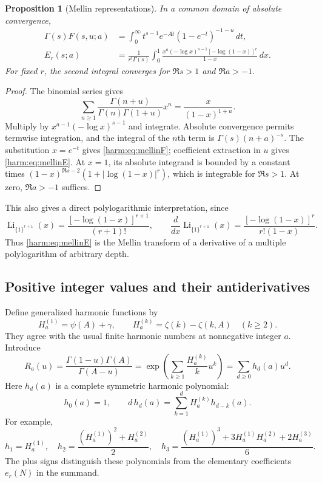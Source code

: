 \documentclass[11pt,letterpaper]{article}
\numberwithin{equation}{section}
\theoremstyle{plain}
\newtheorem{proposition}[theorem]{Proposition}
\theoremstyle{definition}
\theoremstyle{remark}
\begin{document}
\begin{proposition}[Mellin representations]\label{harm:prop:mellin}
In a common domain of absolute convergence,
\begin{align}
 \Gamma(s)F(s,u;a)
 &=\int_0^{\infty}t^{s-1}e^{-At}
                  (1-e^{-t})^{-1-u}\,dt,\label{harm:eq:mellinF}\\
 E_r(s;a)
 &=\frac1{r!\Gamma(s)}\int_0^1
       \frac{x^a(-\log x)^{s-1}[-\log(1-x)]^r}{1-x}\,dx.
       \label{harm:eq:mellinE}
\end{align}
For fixed $r$, the second integral converges for $\Re s>1$ and
$\Re a>-1$.
\end{proposition}
\begin{proof}
The binomial series gives
\[
 \sum_{n\geq1}\frac{\Gamma(n+u)}{\Gamma(n)\Gamma(1+u)}x^n
       =\frac{x}{(1-x)^{1+u}}.
\]
Multiply by $x^{a-1}(-\log x)^{s-1}$ and integrate.  Absolute
convergence permits termwise integration, and the integral of the
$n$th term is $\Gamma(s)(n+a)^{-s}$.  The substitution $x=e^{-t}$
gives \eqref{harm:eq:mellinF}; coefficient extraction in $u$ gives
\eqref{harm:eq:mellinE}.  At $x=1$, its absolute integrand is bounded
by a constant times
$(1-x)^{\Re s-2}(1+|\log(1-x)|^r)$, which is integrable for
$\Re s>1$.  At zero, $\Re a>-1$ suffices.
\end{proof}

This also gives a direct polylogarithmic interpretation, since
\[
 \operatorname{Li}_{\{1\}^{r+1}}(x)
 =\frac{[-\log(1-x)]^{r+1}}{(r+1)!},\qquad
 \frac{d}{dx}\operatorname{Li}_{\{1\}^{r+1}}(x)
 =\frac{[-\log(1-x)]^r}{r!(1-x)}.
\]
Thus \eqref{harm:eq:mellinE} is the Mellin transform of a derivative
of a multiple polylogarithm of arbitrary depth.

\subsection{Positive integer values and their antiderivatives}

Define generalized harmonic functions by
\begin{equation}\label{harm:eq:Hcomplex}
 H_a^{(1)}=\psi(A)+\gamma,\qquad
 H_a^{(k)}=\zeta(k)-\zeta(k,A)\quad(k\geq2).
\end{equation}
They agree with the usual finite harmonic numbers at nonnegative
integer $a$.  Introduce
\begin{equation}\label{harm:eq:R}
 R_a(u)=\frac{\Gamma(1-u)\Gamma(A)}{\Gamma(A-u)}
       =\exp\left(\sum_{k\geq1}\frac{H_a^{(k)}}k u^k\right)
       =\sum_{d\geq0}h_d(a)u^d.
\end{equation}
Here $h_d(a)$ is a complete symmetric harmonic polynomial:
\begin{equation}\label{harm:eq:hrec}
 h_0(a)=1,\qquad
 d\,h_d(a)=\sum_{k=1}^d H_a^{(k)}h_{d-k}(a).
\end{equation}
For example,
\[
 h_1=H_a^{(1)},\quad
 h_2=\frac{(H_a^{(1)})^2+H_a^{(2)}}2,\quad
 h_3=\frac{(H_a^{(1)})^3+3H_a^{(1)}H_a^{(2)}+2H_a^{(3)}}6.
\]
The plus signs distinguish these polynomials from the elementary
coefficients $e_r(N)$ in the summand.
\end{document}
